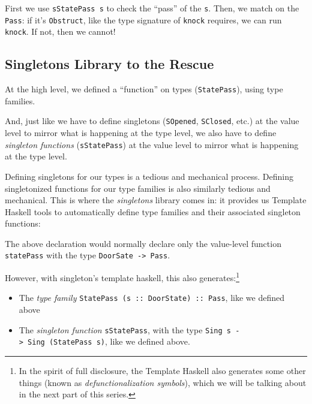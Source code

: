 \documentclass[]{article}
\newenvironment{Shaded}{}{}
\newcommand{\FunctionTok}[1]{\textcolor[rgb]{0.02,0.16,0.49}{#1}}
\newcommand{\NormalTok}[1]{#1}
\begin{document}
First we use \texttt{sStatePass\ s} to check the ``pass'' of the \texttt{s}.
Then, we match on the \texttt{Pass}: if it's
\texttt{\textquotesingle{}Obstruct}, like the type signature of \texttt{knock}
requires, we can run \texttt{knock}. If not, then we cannot!

\hypertarget{singletons-library-to-the-rescue}{%
\subsection{Singletons Library to the
Rescue}\label{singletons-library-to-the-rescue}}

At the high level, we defined a ``function'' on types (\texttt{StatePass}),
using type families.

And, just like we have to define singletons (\texttt{SOpened}, \texttt{SClosed},
etc.) at the value level to mirror what is happening at the type level, we also
have to define \emph{singleton functions} (\texttt{sStatePass}) at the value
level to mirror what is happening at the type level.

Defining singletons for our types is a tedious and mechanical process. Defining
singletonized functions for our type families is also similarly tedious and
mechanical. This is where the \emph{singletons} library comes in: it provides us
Template Haskell tools to automatically define type families and their
associated singleton functions:

\begin{Shaded}
\end{Shaded}

The above declaration would normally declare only the value-level function
\texttt{statePass} with the type \texttt{DoorSate\ -\textgreater{}\ Pass}.

However, with singleton's template haskell, this also generates:\footnote{In the
  spirit of full disclosure, the Template Haskell also generates some other
  things (known as \emph{defunctionalization symbols}), which we will be talking
  about in the next part of this series.}

\begin{itemize}
\tightlist
\item
  The \emph{type family} \texttt{StatePass\ (s\ ::\ DoorState)\ ::\ Pass}, like
  we defined above
\item
  The \emph{singleton function} \texttt{sStatePass}, with the type
  \texttt{Sing\ s\ -\textgreater{}\ Sing\ (StatePass\ s)}, like we defined
  above.
\end{itemize}
\end{document}
